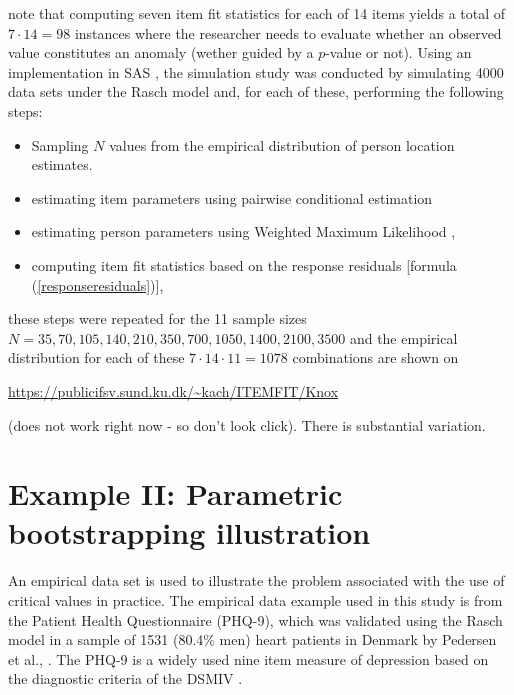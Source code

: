 \documentclass{article}
\begin{document}
note that computing seven item fit statistics for each of 14 items yields a total of $7\cdot14=98$ instances where the researcher needs to evaluate whether an observed value constitutes an anomaly (wether guided by a $p$-value or not). Using an implementation in SAS \cite{christensen2006_SAS,Christensen2013}, the simulation study was conducted by simulating 4000 data sets under the Rasch model and, for each of these, performing the following steps:

\begin{itemize}
\item[(0)] Sampling $N$ values from the empirical distribution of person location estimates.
\item[(i)] estimating item parameters using pairwise conditional estimation \cite{Zwinderman_1995,Andrich2003}
\item[(ii)] estimating person parameters using Weighted Maximum Likelihood \cite{warm},
\item[(iii)] computing item fit statistics based on the response residuals [formula (\ref{responseresiduals})],
\end{itemize}

these steps were repeated for the 11 sample sizes $N=35,70,105,140,210,350,700,1050,1400,2100,3500$ and the empirical distribution for each of these $7\cdot14\cdot11=1078$ combinations are shown on
\begin{center}
\url{https://publicifsv.sund.ku.dk/~kach/ITEMFIT/Knox}
\end{center}
(does not work right now - so don't look click). There is substantial variation.


\section{Example II: Parametric bootstrapping illustration}

An empirical data set is used to illustrate the problem associated with the use of critical values in practice. The empirical data example used in this study is from the Patient Health Questionnaire (PHQ-9), which was validated using the Rasch model in a sample of 1531 (80.4\% men) heart patients in Denmark by Pedersen et al., \cite{pedersen2016}.
The PHQ-9 is a widely used nine item measure of depression based on the diagnostic criteria of the DSMIV \cite{kroenke2003patient}.
\end{document}
